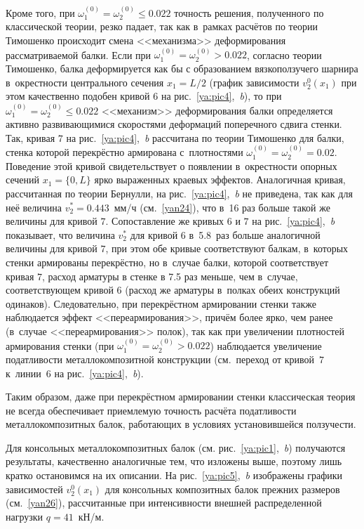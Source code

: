 Кроме того, при $\omega_1^{(0)}=\omega_2^{(0)}\le0.022$ точность решения, 
полученного по классической теории, резко падает, так как в~рамках расчётов по теории Тимошенко происходит смена <<механизма>> деформирования рассматриваемой балки. 
Если при $\omega_1^{(0)}=\omega_2^{(0)}>0.022$, согласно теории Тимошенко, балка деформируется как бы с образованием вязкоползучего шарнира в~окрестности центрального сечения $x_1=L/2$ (график зависимости $v_2^0(x_1)$ 
при этом качественно подобен кривой $6$ на рис.~\ref{ya:pic4},~{\sl b}), 
то при $\omega_1^{(0)}=\omega_2^{(0)}\le0.022$ <<механизм>> деформирования балки определяется активно развивающимися скоростями деформаций поперечного сдвига стенки. 
Так, кривая $7$ на рис.~\ref{ya:pic4},~{\sl b} рассчитана по теории Тимошенко для балки, стенка которой перекрёстно армирована с~плотностями $\omega_1^{(0)}=\omega_2^{(0)}=0.02$. 
Поведение этой кривой свидетельствует о появлении в~окрестности опорных сечений $x_1=\{ 0, L\}$ ярко выраженных краевых эффектов. 
Аналогичная кривая, рассчитанная по теории Бернулли, на рис.~\ref{ya:pic4},~{\sl b} не приведена, так как для неё величина $v_2^*=0.443$~мм/ч (см.~\eqref{yan24}), что в~16 раз больше такой же величины для кривой $7$. 
Сопоставление же кривых $6$ и $7$ на рис.~\ref{ya:pic4},~{\sl b} показывает, что величина $v_2^*$ 
для кривой $6$ в~5.8~раз больше аналогичной величины для кривой $7$, 
при этом обе кривые соответствуют балкам, в~которых стенки армированы перекрёстно, 
но в~случае балки, которой соответствует кривая $7$, расход арматуры в стенке в 7.5 раз меньше, 
чем в~случае, соответствующем кривой $6$ (расход же арматуры в~полках обеих конструкций одинаков). 
Следовательно, при перекрёстном армировании стенки также наблюдается эффект <<переармирования>>, 
причём более ярко, чем ранее (в~случае <<переармирования>> полок), 
так как при увеличении плотностей армирования стенки (при $\omega_1^{(0)}=\omega_2^{(0)}>0.022$) 
наблюдается увеличение податливости металлокомпозитной конструкции 
(см.~переход от кривой~$7$ к~линии~$6$ на рис.~\ref{ya:pic4},~{\sl b}).

Таким образом, даже при перекрёстном армировании стенки классическая теория не всегда 
обеспечивает приемлемую точность расчёта податливости металлокомпозитных балок, работающих в условиях установившейся ползучести.

Для консольных металлокомпозитных балок (см. рис.~\ref{ya:pic1},~{\sl b}) получаются результаты, 
качественно аналогичные тем, что изложены выше, поэтому лишь кратко остановимся на их описании. 
На рис.~\ref{ya:pic5},~{\sl b} изображены графики зависимостей $v_2^0(x_1)$ для консольных композитных 
балок прежних размеров (см.~\eqref{yan26}), рассчитанные при интенсивности внешней распределенной 
нагрузки $q=41$~кН/м.

